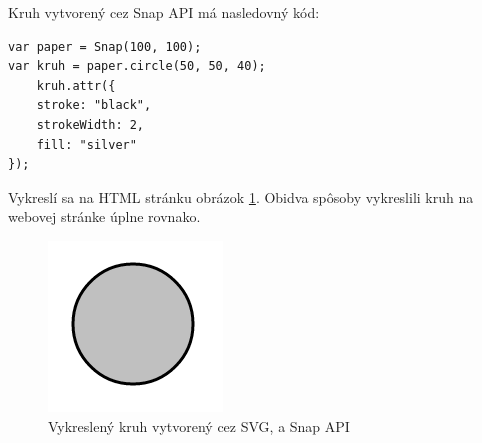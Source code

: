 Kruh vytvorený cez Snap API má nasledovný kód:

\begin{lstlisting}
var paper = Snap(100, 100);
var kruh = paper.circle(50, 50, 40);
	kruh.attr({
	stroke: "black", 
	strokeWidth: 2, 
	fill: "silver"
});

\end{lstlisting}


Vykreslí sa na HTML stránku obrázok \ref{jednoduchyKruh}. Obidva spôsoby vykreslili kruh na webovej stránke úplne rovnako.  
 
 \begin{figure}[hp]
 	\begin{center}
 		\includegraphics  {obrazky/jednoduchyKruh.png}
 		\caption{Vykreslený kruh vytvorený cez SVG, a Snap API}
 		\label{jednoduchyKruh}
 	\end{center}
 \end{figure}









